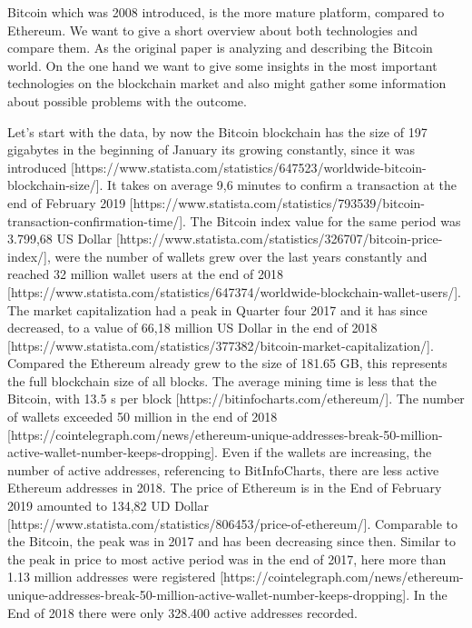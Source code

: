 Bitcoin which was 2008 introduced, is the more mature platform, compared to Ethereum. 
We want to give a short overview about both technologies and compare them. As the original paper is analyzing and describing the Bitcoin world. 
On the one hand we want to give some insights in the most important technologies on the blockchain market and also might gather some information about possible problems with the outcome. 

Let’s start with the data, by now the Bitcoin blockchain has the size of 197 gigabytes in the beginning of January its growing constantly, since it was introduced [https://www.statista.com/statistics/647523/worldwide-bitcoin-blockchain-size/].
It takes on average 9,6 minutes to confirm a transaction at the end of February 2019 [https://www.statista.com/statistics/793539/bitcoin-transaction-confirmation-time/]. 
The Bitcoin index value for the same period was 3.799,68 US Dollar [https://www.statista.com/statistics/326707/bitcoin-price-index/], were the number of wallets grew over the last years constantly and reached 32 million wallet users at the end of 2018 [https://www.statista.com/statistics/647374/worldwide-blockchain-wallet-users/].
The market capitalization had a peak in Quarter four 2017 and it has since decreased, to a value of 66,18 million US Dollar in the end of 2018 [https://www.statista.com/statistics/377382/bitcoin-market-capitalization/].
Compared the Ethereum already grew to the size of 181.65 GB, this represents the full blockchain size of all blocks. The average mining time is less that the Bitcoin, with 13.5 s per block [https://bitinfocharts.com/ethereum/]. The number of wallets exceeded 50 million in the end of 2018 [https://cointelegraph.com/news/ethereum-unique-addresses-break-50-million-active-wallet-number-keeps-dropping].
Even if the wallets are increasing, the number of active addresses, referencing to BitInfoCharts, there are less active Ethereum addresses in 2018. 
The price of Ethereum is in the End of February 2019 amounted to 134,82 UD Dollar [https://www.statista.com/statistics/806453/price-of-ethereum/].
Comparable to the Bitcoin, the peak was in 2017 and has been decreasing since then. 
Similar to the peak in price to most active period was in the end of 2017, here more than 1.13 million addresses were registered [https://cointelegraph.com/news/ethereum-unique-addresses-break-50-million-active-wallet-number-keeps-dropping]. In the End of 2018 there were only 328.400 active addresses recorded. 

